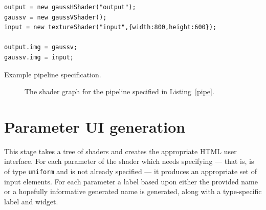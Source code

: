 \documentclass[12pt,twoside,notitlepage]{report}
\begin{document}
\begin{listing}[H]
\begin{verbatim}
output = new gaussHShader("output");
gaussv = new gaussVShader();
input = new textureShader("input",{width:800,height:600});

output.img = gaussv;
gaussv.img = input;
\end{verbatim}
\caption{Example pipeline specification.\label{pipe}}
\end{listing}

\begin{figure}

\caption{The shader graph for the pipeline specified in Listing~\ref{pipe}.\label{pipe-graph}}
\end{figure}

\clearpage
\section{Parameter UI generation}
\label{ui-params}
This stage takes a tree of shaders and creates the appropriate HTML user interface. For each parameter of the shader which needs specifying --- that is, is of type \texttt{uniform} and is not already specified --- it produces an appropriate set of input elements. For each parameter a label based upon either the provided name or a hopefully informative generated name is generated, along with a type-specific label and widget.
\end{document}
